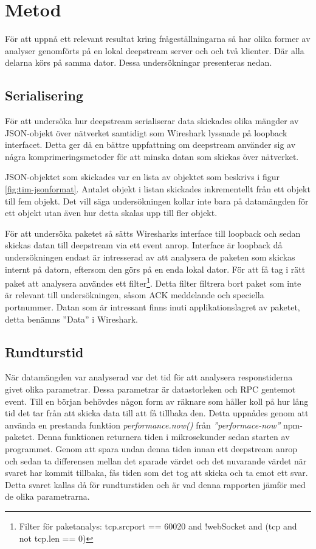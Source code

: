 \section{Metod}
\label{sec:tim-method}
För att uppnå ett relevant resultat kring frågeställningarna så har olika former av analyser genomförts på en lokal deepstream server och och två klienter. Där alla delarna körs på samma dator. Dessa undersökningar presenteras nedan.

\subsection{Serialisering}
\label{subsec:tim-method-serializing}
För att undersöka hur deepstream serialiserar data skickades olika mängder av JSON-objekt över nätverket samtidigt som Wireshark lyssnade på loopback interfacet. Detta ger då en bättre uppfattning om deepstream använder sig av några komprimeringsmetoder för att minska datan som skickas över nätverket.

JSON-objektet som skickades var en lista av objektet som beskrivs i figur \ref{fig:tim-jsonformat}. Antalet objekt i listan skickades inkrementellt från ett objekt till fem objekt. Det vill säga undersökningen kollar inte bara på datamängden för ett objekt utan även hur detta skalas upp till fler objekt. 

För att undersöka paketet så sätts Wiresharks interface till loopback och sedan skickas datan till deepstream via ett event anrop. Interface är loopback då undersökningen endast är intresserad av att analysera de paketen som skickas internt på datorn, eftersom den görs på en enda lokal dator. För att få tag i rätt paket att analysera användes ett filter\footnote{Filter för paketanalys: tcp.srcport == 60020 and !webSocket and (tcp and not tcp.len == 0)}. Detta filter filtrera bort paket som inte är relevant till undersökningen, såsom ACK meddelande och speciella portnummer. Datan som är intressant finns inuti applikationslagret av paketet, detta benämns ''Data'' i Wireshark.

\subsection{Rundturstid}
\label{subsec:tim-method-response}
När datamängden var analyserad var det tid för att analysera responstiderna givet olika parametrar. Dessa parametrar är datastorleken och RPC gentemot event. Till en början behövdes någon form av räknare som håller koll på hur lång tid det tar från att skicka data till att få tillbaka den. Detta uppnådes genom att använda en prestanda funktion \textit{performance.now()} från \textit{''performace-now''} npm-paketet.\cite{performance-now} Denna funktionen returnera tiden i mikrosekunder sedan starten av programmet. Genom att spara undan denna tiden innan ett deepstream anrop och sedan ta differensen mellan det sparade värdet och det nuvarande värdet när svaret har kommit tillbaka, fås tiden som det tog att skicka och ta emot ett svar. Detta svaret kallas då för rundturstiden och är vad denna rapporten jämför med de olika parametrarna. 

